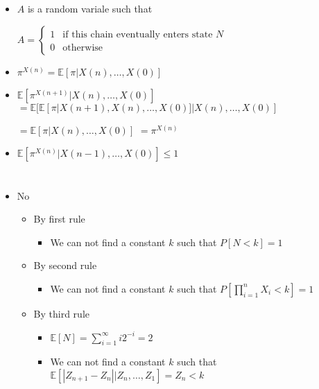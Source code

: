 \documentclass[a4paper]{article}
\begin{document}
\section{}
\begin{itemize}
        \begin{figure} [H]
            \texttt{[image: image/8.png]}
        \end{figure}
    \item $A$ is a random variale such that

        $A = \left\{ \begin{array}{cc} 1 & \text{if this chain eventually enters state $N$} \\ 0 & \text{otherwise} \end{array} \right.$
    \item $\pi^{X(n)} = \mathbb{E}[\pi|X(n), \dots, X(0)]$
    \item $\mathbb{E}[\pi^{X(n+1)}| X(n), \dots, X(0)]$
        $= \mathbb{E}[\mathbb{E}[\pi|X(n+1), X(n), \dots, X(0)]| X(n), \dots, X(0)]$

        $= \mathbb{E}[\pi|X(n), \dots, X(0)]$
        $= \pi^{X(n)}$
    \item $\mathbb{E}[\pi^{X(n)}| X(n-1), \dots, X(0)] \leq 1$
\end{itemize}

\section{}
\begin{itemize}
        \begin{figure} [H]
            \texttt{[image: image/9.png]}
        \end{figure}
    \item No
        \begin{itemize}
            \item By first rule
                \begin{itemize}
                    \item We can not find a constant $k$ such that $P[N<k] = 1$
                \end{itemize}
            \item By second rule
                \begin{itemize}
                    \item We can not find a constant $k$ such that $P[\prod_{i=1}^n X_i < k] = 1$
                \end{itemize}
            \item By third rule
                \begin{itemize}
                    \item $\mathbb{E}[N] = \sum_{i=1}^\infty i 2^{-i} = 2$
                    \item We can not find a constant $k$ such that $\mathbb{E}[|Z_{n+1} - Z_n||Z_n, \dots, Z_1] = Z_n < k$
                \end{itemize}
        \end{itemize}
\end{itemize}
\end{document}
